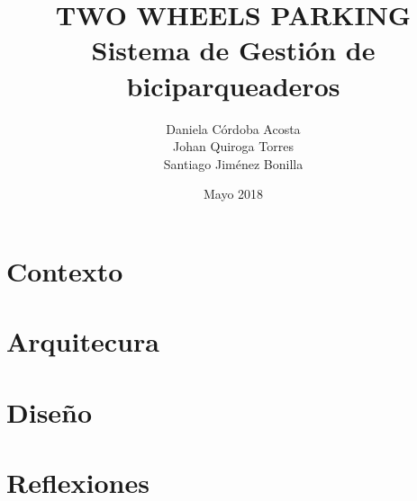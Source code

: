 \documentclass[openany,12pts,letterpaper,oneside,onecolumn]{book}
\begin{document}
\author{  Daniela Córdoba Acosta\\
	Johan Quiroga Torres\\
	Santiago Jiménez Bonilla
}
\title{	TWO WHEELS PARKING\\
	Sistema de Gestión de biciparqueaderos}

\date{Mayo 2018}

\frontmatter
\maketitle
\tableofcontents

\mainmatter

\part{Contexto}




\part{Arquitecura}








\part{Diseño}











\part{Reflexiones}




\backmatter


\end{document}
